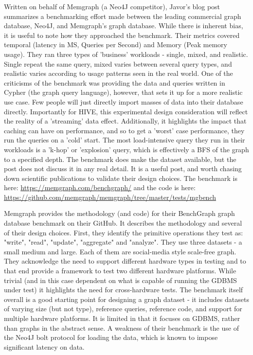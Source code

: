 \par{Written on behalf of Memgraph (a Neo4J competitor), Javor's blog post summarizes a benchmarking effort made between the leading commercial graph database, Neo4J, and Memgraph's graph database. While there is inherent bias, it is useful to note how they approached the benchmark. Their metrics covered temporal (latency in MS, Queries per Second) and Memory (Peak memory usage). They ran three types of 'business' workloads - single, mixed, and realistic. Single repeat the same query, mixed varies between several query types, and realistic varies according to usage patterns seen in the real world. One of the criticisms of the benchmark was providing the data and queries written in Cypher (the graph query language), however, that sets it up for a more realistic use case. Few people will just directly import masses of data into their database directly. Importantly for HIVE, this experimental design consideration will reflect the reality of a 'streaming' data effect. Additionally, it highlights the impact that caching can have on performance, and so to get a 'worst' case performance, they run the queries on a 'cold' start. The most load-intensive query they run in their workloads is a 'k-hop' or 'explosion' query, which is effectively a BFS of the graph to a specified depth. The benchmark does make the dataset available, but the post does not discuss it in any real detail. It is a useful post, and worth chasing down scientific publications to validate their design choices. The benchmark is here: \url{https://memgraph.com/benchgraph/} and the code is here: \url{https://github.com/memgraph/memgraph/tree/master/tests/mgbench}~\cite{Javor2023}}

\par{Memgraph provides the methodology (and code) for their BenchGraph graph database benchmark on their GitHub. 
It describes the methodology and several of their design choices. 
First, they identify the primitive operations they test as: "write", "read", "update", "aggregate" and "analyze". 
They use three datasets - a small medium and large. Each of them are social-media style scale-free graph. They acknowledge the need to support different hardware types in testing and to that end provide a framework to test two different hardware platforms. 
While trivial (and in this case dependent on what is capable of running the GDBMS under test) it highlights the need for cross-hardware tests. 
The benchmark itself overall is a good starting point for designing a graph dataset - it includes datasets of varying size (but not type), reference queries, reference code, and support for multiple hardware platforms. 
It is limited in that it focuses on GDBMS, rather than graphs in the abstract sense. 
A weakness of their benchmark is the use of the Neo4J bolt protocol for loading the data, which is known to impose significant latency on data.~\cite{Memgraph2023}}

